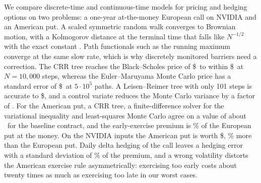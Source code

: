 We compare discrete-time and continuous-time models for pricing and hedging options on two problems: a one-year at-the-money European call on NVIDIA and an American put.
A scaled symmetric random walk converges to Brownian motion, with a Kolmogorov distance at the terminal time that falls like $N^{-1/2}$ with the exact constant \KSconst.
Path functionals such as the running maximum converge at the same slow rate, which is why discretely monitored barriers need a correction.
The CRR tree reaches the Black--Scholes price of \$\BSprice\ to within \$\CRRtenkErr\ at $N=10{,}000$ steps, whereas the Euler--Maruyama Monte Carlo price has a standard error of \$\MCbestSE\ at $5\cdot10^5$ paths.
A Leisen--Reimer tree with only 101 steps is accurate to \$\DeskLrErr, and a control variate reduces the Monte Carlo variance by a factor of \VRcv.
For the American put, a CRR tree, a finite-difference solver for the variational inequality and least-squares Monte Carlo agree on a value of about \TreeRichV\ for the baseline contract, and the early-exercise premium is \EEPatmPct\% of the European put at the money.
On the NVIDIA inputs the American put is worth \$\NvdaPutAm, \NvdaPutEEPpct\% more than the European put.
Daily delta hedging of the call leaves a hedging error with a standard deviation of \HedgeSDdailyPct\% of the premium, and a wrong volatility distorts the American exercise rule asymmetrically: exercising too early costs about twenty times as much as exercising too late in our worst cases.
